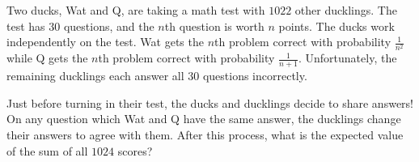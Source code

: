 Two ducks, Wat and Q, are taking a math test with $1022$ other ducklings. The test has $30$ questions, and the $n$th question is worth $n$ points.  The ducks work independently on the test. Wat gets the $n$th problem correct with probability $\frac{1}{n^2}$ while Q gets the $n$th problem correct with probability $\frac{1}{n+1}$. Unfortunately, the remaining ducklings each answer all $30$ questions incorrectly.

Just before turning in their test, the ducks and ducklings decide to share answers! On any question which Wat and Q have the same answer, the ducklings change their answers to agree with them.  After this process, what is the expected value of the sum of all $1024$ scores?
